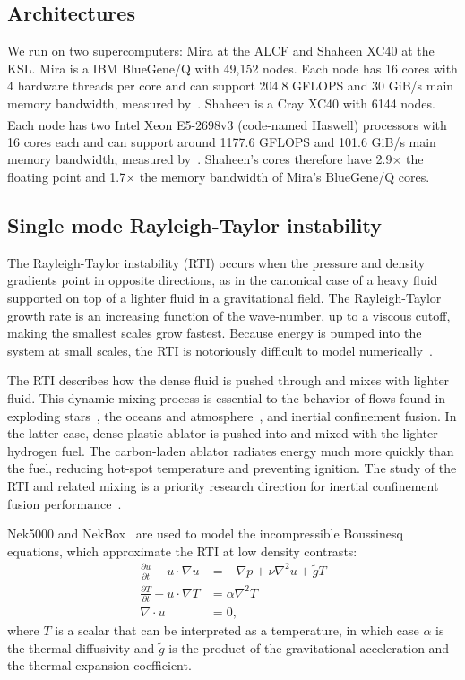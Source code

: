 \subsection{Architectures} 

We run on two supercomputers: Mira at the ALCF and Shaheen XC40 at the KSL.
Mira is a IBM BlueGene/Q with 49,152 nodes.
Each node has 16 cores with 4 hardware threads per core and can support 204.8
GFLOPS and 30 GiB/s main memory bandwidth, measured by~\cite{McCalpin2007}.
Shaheen is a Cray XC40 with 6144 nodes.
Each node has two Intel\textsuperscript{\textregistered}
Xeon\textsuperscript{\textregistered} E5-2698v3 (code-named Haswell) processors
with 16 cores each and can support around 1177.6 GFLOPS and 101.6 GiB/s main memory bandwidth, measured by~\cite{McCalpin2007}.
Shaheen's cores therefore have 2.9$\times$ the floating point and 1.7$\times$ the memory bandwidth of Mira's BlueGene/Q cores.

\subsection{Single mode Rayleigh-Taylor instability}

The Rayleigh-Taylor instability (RTI) occurs when the pressure and density gradients point in opposite directions, as in the canonical case of a heavy fluid supported on top of a lighter fluid in a gravitational field.
The Rayleigh-Taylor growth rate is an increasing function of the wave-number, up to a viscous cutoff, making the smallest scales grow fastest.
Because energy is pumped into the system at small scales, the RTI is notoriously difficult to model numerically~\cite{Dimonte2004}.

The RTI describes how the dense fluid is pushed through and mixes with lighter fluid.
This dynamic mixing process is essential to the behavior of flows found in exploding stars~\cite{Bell2004}, the oceans and atmosphere~\cite{Linden1973}, and inertial confinement fusion.
In the latter case, dense plastic ablator is pushed into and mixed with the lighter hydrogen fuel.
The carbon-laden ablator radiates energy much more quickly than the fuel, reducing hot-spot temperature and preventing ignition.
The study of the RTI and related mixing is a priority research direction for inertial confinement fusion performance~\cite{Goncharov2012}.

Nek5000 and NekBox~\cite{NekBox2} are used to model the incompressible Boussinesq equations, which approximate the RTI at low density contrasts:
\begin{align}
\frac{\partial u}{\partial t} + u \cdot \nabla u &= - \nabla p + \nu \nabla^2 u + \tilde{g} T \\
\frac{\partial T}{\partial t} + u \cdot \nabla T &= \alpha \nabla^2 T \\
\nabla \cdot u &= 0,
\end{align}
where $T$ is a scalar that can be interpreted as a temperature, 
in which case $\alpha$ is the thermal diffusivity 
and $\tilde{g}$ is the product of the gravitational acceleration and the thermal expansion coefficient.

